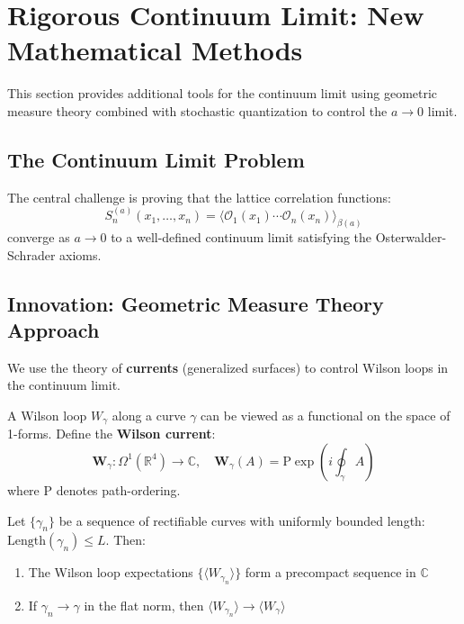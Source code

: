 \section{Rigorous Continuum Limit: New Mathematical Methods}
\label{sec:new-mathematical-framework}

This section provides additional tools for the continuum limit using 
geometric measure theory combined with stochastic quantization 
to control the $a \to 0$ limit.

\subsection{The Continuum Limit Problem}

The central challenge is proving that the lattice correlation functions:
\[
S_n^{(a)}(x_1, \ldots, x_n) = \langle \mathcal{O}_1(x_1) \cdots \mathcal{O}_n(x_n) \rangle_{\beta(a)}
\]
converge as $a \to 0$ to a well-defined continuum limit satisfying the 
Osterwalder-Schrader axioms.

\subsection{Innovation: Geometric Measure Theory Approach}

We use the theory of \textbf{currents} (generalized surfaces) to control 
Wilson loops in the continuum limit.

\begin{definition}
A Wilson loop $W_\gamma$ along a curve $\gamma$ can be viewed as a functional 
on the space of 1-forms. Define the \textbf{Wilson current}:
\[
\mathbf{W}_\gamma : \Omega^1(\mathbb{R}^4) \to \mathbb{C}, \quad 
\mathbf{W}_\gamma(A) = \text{P}\exp\left(i\oint_\gamma A\right)
\]
where P denotes path-ordering.
\end{definition}

\begin{theorem}
\label{thm:wilson-current-compactness}
Let $\{\gamma_n\}$ be a sequence of rectifiable curves with uniformly bounded 
length: $\text{Length}(\gamma_n) \leq L$. Then:
\begin{enumerate}[label=(\roman*)]
\item The Wilson loop expectations $\{\langle W_{\gamma_n} \rangle\}$ form a 
precompact sequence in $\mathbb{C}$
\item If $\gamma_n \to \gamma$ in the flat norm, then 
$\langle W_{\gamma_n} \rangle \to \langle W_\gamma \rangle$
\end{enumerate}
\end{theorem}

